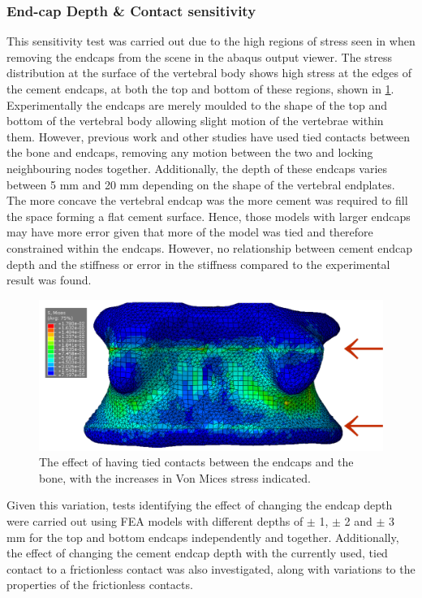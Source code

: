 \subsubsection{End-cap Depth \& Contact sensitivity}
This sensitivity test was carried out due to the high regions of stress seen in when removing the endcaps from the scene in the abaqus output viewer.
The stress distribution at the surface of the vertebral body shows high stress
at the edges of the cement endcaps, at both the top and bottom of these
regions, shown in \cref{fig:stress_lines}.
Experimentally the endcaps are merely moulded to the shape of the top and
bottom of the vertebral body allowing slight motion of the vertebrae within them. However, previous work and other studies have
used tied contacts between the bone and endcaps, removing any motion between the
two and locking neighbouring nodes together.
Additionally, the depth of these endcaps varies between 5 mm and 20 mm
depending on the shape of the vertebral endplates.
The more concave the vertebral endcap was the more cement was required to fill
the space forming a flat cement surface. Hence, those models with larger endcaps may have more error given that more of the model was tied and therefore constrained within the endcaps. However, no relationship between cement endcap depth and the stiffness or error in the stiffness compared to the experimental result was found.

\begin{figure}[h!]
\centering
\includegraphics[width=.65\textwidth]{Chapters/Chapter_HT_images/stress_lines.pdf}
\caption{The effect of having tied contacts between the endcaps and the bone,
with the increases in Von Mices stress indicated.}
\label{fig:stress_lines}
\end{figure}


Given this variation, tests identifying the effect of changing the endcap depth
were carried out using FEA models with different depths of $\pm$ 1, $\pm$ 2 and
$\pm$ 3 mm for the top and bottom endcaps independently and together.
Additionally, the effect of changing the cement endcap depth with the currently used, tied contact to a frictionless
contact was also investigated, along with variations to the properties of the
frictionless contacts.

